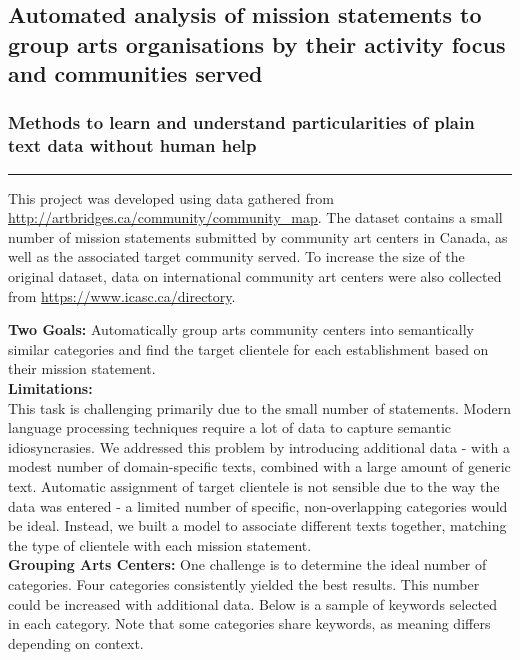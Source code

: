 \documentclass{article}
\begin{document}
\subsection*{Automated analysis of mission statements to group arts organisations by their activity focus and communities served}

\vspace{.2cm}

\subsubsection*{Methods to learn and understand particularities of plain text data without human help}

\begin{center}
\rule{5cm}{0.4pt}
\end{center}

\noindent
This project was developed using data gathered from \url{http://artbridges.ca/community/community_map}. The dataset contains a small number of mission statements submitted by community art centers in Canada, as well as the associated target community served. To increase the size of the original dataset, data on international community art centers were also collected from \url{https://www.icasc.ca/directory}.

\vspace{.5cm}

\noindent
\textbf{Two Goals:} Automatically group arts community centers into semantically similar categories and find the target clientele for each establishment based on their mission statement.\\

\noindent
\textbf{Limitations:}\\
\noindent
This task is challenging primarily due to the small number of statements. Modern language processing techniques require a lot of data to capture semantic idiosyncrasies. We addressed this problem by introducing additional data - with a modest number of domain-specific texts, combined with a large amount of generic text. Automatic assignment of target clientele is not sensible due to the way the data was entered - a limited number of specific, non-overlapping categories would be ideal. Instead, we built a model to associate different texts together, matching the type of clientele with each mission statement.\\

\noindent
\textbf{Grouping Arts Centers:} One challenge is to determine the ideal number of categories. Four categories consistently yielded the best results. This number could be increased with additional data. Below is a sample of keywords selected in each category. Note that some categories share keywords, as meaning differs depending on context.
\end{document}

